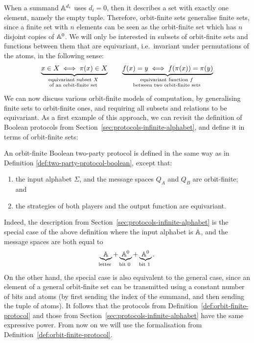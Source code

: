 When a summand $\mathbb A^{d_i}$ uses $d_i =0$, then it  describes a set with exactly one element, namely the empty tuple. Therefore, orbit-finite sets generalise finite sets, since a  finite set with $n$ elements can be seen as the orbit-finite set which has $n$ disjoint copies of $\mathbb A^0$. We will only be interested in subsets of orbit-finite sets and functions between them that are equivariant, i.e.~invariant under permutations of the atoms, in the following sense:
\begin{align*}
\myunderbrace{x \in X \iff \pi(x) \in X}{equivariant subset $X$ \\ of an orbit-finite set}
\qquad 
\myunderbrace{f(x) = y \iff f(\pi(x)) = \pi(y)}{equivariant function $f$ \\ between two orbit-finite sets}
\end{align*}
We can now discuss various orbit-finite models of computation, by generalising finite sets to orbit-finite ones, and requiring all subsets and relations to be equivariant. As a first example of this approach, we can revisit the definition of Boolean protocols from Section~\ref{sec:protocols-infinite-alphabet}, and define it in terms of orbit-finite sets:

\begin{definition}
    \label{def:orbit-finite-protocol}
  An orbit-finite Boolean two-party protocol  is defined in the same way as in Definition \ref{def:two-party-protocol-boolean}, except that:
  \begin{enumerate}
    \item the input alphabet $\Sigma$, and the message spaces $Q_A$ and $Q_B$ are orbit-finite; and 
    \item the strategies of both players and the output function are equivariant.
  \end{enumerate}
\end{definition}

Indeed, the description from Section~\ref{sec:protocols-infinite-alphabet} is  the special case of the above definition where the input alphabet is $\mathbb A$, and the message spaces are both equal to 
\begin{align*}
\myunderbrace{\atoms}{letter} + \myunderbrace{\atoms^0}{bit 0} + \myunderbrace{\atoms^0}{bit 1}.
\end{align*}
On the other hand, the special case is also equivalent to the general case, since an element of a general orbit-finite set can be
transmitted using a constant number of bits and atoms (by first sending the index of the summand, and then sending the tuple of atoms).
It follows that the protocols from Definition~\ref{def:orbit-finite-protocol} and those from Section~\ref{sec:protocols-infinite-alphabet} have the same expressive power. From now on we will use the formalisation from Definition~\ref{def:orbit-finite-protocol}.

